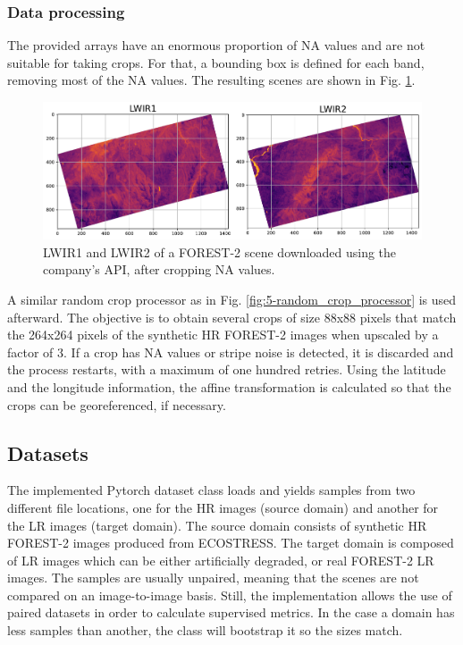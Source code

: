     \subsubsection{Data processing}

    The provided arrays have an enormous proportion of NA values and are not suitable for taking crops.
    For that, a bounding box is defined for each band, removing most of the NA values. 
    The resulting scenes are shown in Fig. \ref{fig:4-forest-bounding-box}.

    \begin{figure}[H]
        \centering
        \includegraphics[width=\linewidth]{Includes/4-forest2-cropped-bands.pdf}
        \caption{LWIR1 and LWIR2 of a FOREST-2 scene downloaded using the company's API, after cropping NA values.}
        \label{fig:4-forest-bounding-box}
    \end{figure}

    A similar random crop processor as in Fig. \ref{fig:5-random_crop_processor} is used afterward. 
    The objective is to obtain several crops of size 88x88 pixels that match the 264x264 pixels of the synthetic HR FOREST-2 images when upscaled by a factor of 3.
    If a crop has  NA values or stripe noise is detected, it is discarded and the process restarts, with a maximum of one hundred retries.
    Using the latitude and the longitude information, the affine transformation is calculated so that the crops can be georeferenced, if necessary.
    
\subsection{Datasets}

The implemented Pytorch dataset class loads and yields samples from two different file locations, one for the HR images (source domain) and another for the LR images (target domain). 
The source domain consists of synthetic HR FOREST-2 images produced from ECOSTRESS. The target domain is composed of LR images which can be either artificially degraded, or real FOREST-2 LR images.
The samples are usually unpaired, meaning that the scenes are not compared on an image-to-image basis. Still, the implementation allows the use of paired datasets in order to calculate supervised metrics. 
In the case a domain has less samples than another, the class will bootstrap it so the sizes match.

